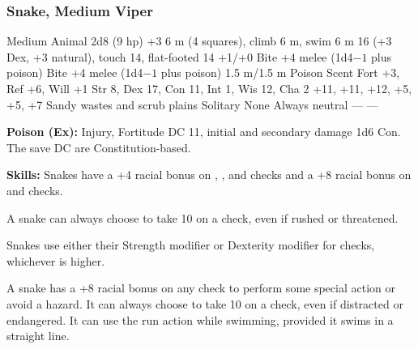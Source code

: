 \subsubsection{Snake, Medium Viper}
\begin{MonsterStats}
{Medium Animal}
{2d8 (9 hp)}
{+3}
{6 m (4 squares), climb 6 m, swim 6 m}
{16 (+3 Dex, +3 natural), touch 14, flat-footed 14}
{+1/+0}
{Bite +4 melee (1d4$-1$ plus poison)}
{Bite +4 melee (1d4$-1$ plus poison)}
{1.5 m/1.5 m}
{Poison}
{Scent}
{Fort +3, Ref +6, Will +1}
{Str 8, Dex 17, Con 11, Int 1, Wis 12, Cha 2}
{ +11,  +11,  +12,  +5,  +5,  +7}
{}
{Sandy wastes and scrub plains}
{Solitary}
{\onehalf}
{None}
{Always neutral}
{---}
{---}
\end{MonsterStats}

\textbf{Poison (Ex):} Injury, Fortitude DC 11, initial and secondary damage 1d6 Con. The save DC are Constitution-based.

\textbf{Skills:} Snakes have a +4 racial bonus on , , and  checks and a +8 racial bonus on  and  checks.

A snake can always choose to take 10 on a  check, even if rushed or threatened.

Snakes use either their Strength modifier or Dexterity modifier for  checks, whichever is higher.

A snake has a +8 racial bonus on any  check to perform some special action or avoid a hazard. It can always choose to take 10 on a  check, even if distracted or endangered. It can use the run action while swimming, provided it swims in a straight line.
